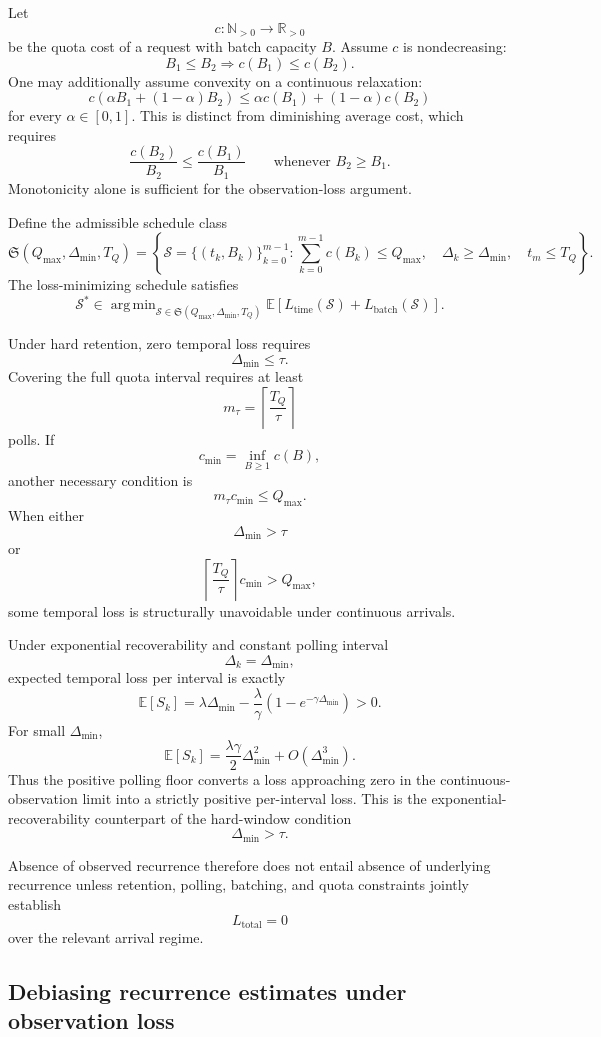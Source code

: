 \documentclass[11pt]{article}
\theoremstyle{definition}
\DeclareMathOperator{\argmin}{arg\,min}
\newcommand{\E}{\mathbb{E}}
\begin{document}
Let
\[
c:\mathbb{N}_{>0}\to\mathbb{R}_{>0}
\]
be the quota cost of a request with batch capacity \(B\). Assume \(c\) is nondecreasing:
\[
B_1\leq B_2
\Longrightarrow
c(B_1)\leq c(B_2).
\]
One may additionally assume convexity on a continuous relaxation:
\[
c\!\left(
\alpha B_1+(1-\alpha)B_2
\right)
\leq
\alpha c(B_1)+(1-\alpha)c(B_2)
\]
for every \(\alpha\in[0,1]\). This is distinct from diminishing average cost, which requires
\[
\frac{c(B_2)}{B_2}
\leq
\frac{c(B_1)}{B_1}
\qquad
\text{whenever }B_2\geq B_1.
\]
Monotonicity alone is sufficient for the observation-loss argument.

Define the admissible schedule class
\[
\mathfrak{S}(Q_{\max},\Delta_{\min},T_Q)
=
\left\{
\mathcal{S}
=
\{(t_k,B_k)\}_{k=0}^{m-1}
:
\sum_{k=0}^{m-1}c(B_k)\leq Q_{\max},
\quad
\Delta_k\geq\Delta_{\min},
\quad
t_m\leq T_Q
\right\}.
\]
The loss-minimizing schedule satisfies
\[
\mathcal{S}^{*}
\in
\argmin_{
\mathcal{S}\in
\mathfrak{S}(Q_{\max},\Delta_{\min},T_Q)
}
\E\!\left[
L_{\mathrm{time}}(\mathcal{S})
+
L_{\mathrm{batch}}(\mathcal{S})
\right].
\]

Under hard retention, zero temporal loss requires
\[
\Delta_{\min}\leq\tau.
\]
Covering the full quota interval requires at least
\[
m_{\tau}
=
\left\lceil
\frac{T_Q}{\tau}
\right\rceil
\]
polls. If
\[
c_{\min}
=
\inf_{B\geq1}c(B),
\]
another necessary condition is
\[
m_{\tau}c_{\min}\leq Q_{\max}.
\]
When either
\[
\Delta_{\min}>\tau
\]
or
\[
\left\lceil
\frac{T_Q}{\tau}
\right\rceil c_{\min}>Q_{\max},
\]
some temporal loss is structurally unavoidable under continuous arrivals.

Under exponential recoverability and constant polling interval
\[
\Delta_k=\Delta_{\min},
\]
expected temporal loss per interval is exactly
\[
\E[S_k]
=
\lambda\Delta_{\min}
-
\frac{\lambda}{\gamma}
\left(
1-e^{-\gamma\Delta_{\min}}
\right)
>
0.
\]
For small \(\Delta_{\min}\),
\[
\E[S_k]
=
\frac{\lambda\gamma}{2}
\Delta_{\min}^2
+
O(\Delta_{\min}^3).
\]
Thus the positive polling floor converts a loss approaching zero in the continuous-observation limit into a strictly positive per-interval loss. This is the exponential-recoverability counterpart of the hard-window condition
\[
\Delta_{\min}>\tau.
\]

Absence of observed recurrence therefore does not entail absence of underlying recurrence unless retention, polling, batching, and quota constraints jointly establish
\[
L_{\mathrm{total}}=0
\]
over the relevant arrival regime.

\subsection{Debiasing recurrence estimates under observation loss}
\end{document}

